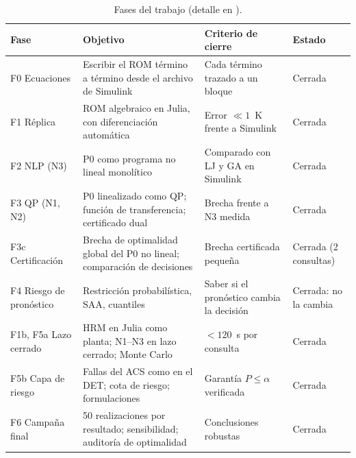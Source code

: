 \begin{table}[H]\centering\small
\begin{tabularx}{\linewidth}{@{}l Y Y l@{}}\toprule
Fase & Objetivo & Criterio de cierre & Estado\\\midrule
F0 Ecuaciones & Escribir el ROM término a término desde el archivo de Simulink & Cada término trazado a un bloque & Cerrada\\
F1 Réplica & ROM algebraico en Julia, con diferenciación automática & Error $\ll1$~K frente a Simulink & Cerrada\\
F2 NLP (N3) & P0 como programa no lineal monolítico & Comparado con LJ y GA en Simulink & Cerrada\\
F3 QP (N1, N2) & P0 linealizado como QP; función de transferencia; certificado dual & Brecha frente a N3 medida & Cerrada\\
F3c Certificación & Brecha de optimalidad global del P0 no lineal; comparación de decisiones & Brecha certificada pequeña & Cerrada (2 consultas)\\
F4 Riesgo de pronóstico & Restricción probabilística, SAA, cuantiles & Saber si el pronóstico cambia la decisión & Cerrada: no la cambia\\
F1b, F5a Lazo cerrado & HRM en Julia como planta; N1--N3 en lazo cerrado; Monte Carlo & $<120$~s por consulta & Cerrada\\
F5b Capa de riesgo & Fallas del ACS como en el DET; cota de riesgo; formulaciones & Garantía $P\le\alpha$ verificada & Cerrada\\
F6 Campaña final & 50 realizaciones por resultado; sensibilidad; auditoría de optimalidad & Conclusiones robustas & Cerrada\\\bottomrule
\end{tabularx}
\caption{Fases del trabajo (detalle en ).}
\label{tab:fases}
\end{table}

